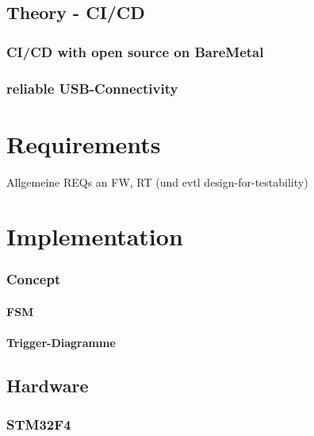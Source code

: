 	\section{Theory - CI/CD}
	\subsection{CI/CD with open source on BareMetal}
	\subsection{reliable USB-Connectivity}
	
\chapter{Requirements}
\label{cha:Requirements}
	Allgemeine REQs an FW, RT (und evtl design-for-testability)

\chapter{Implementation}
\label{cha:Implementation}
	\subsection{Concept}
	\subsubsection{FSM}
	\subsubsection{Trigger-Diagramme}

	\section{Hardware}
		\subsection{STM32F4}
